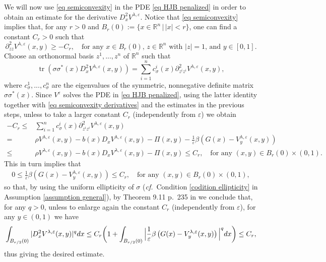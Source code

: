 \documentclass[11pt]{amsart}
\theoremstyle{plain}
\def \dd{{\rm d}}
\def \R{\mathbb{R}}
\DeclareMathOperator*{\tr}{tr}
\numberwithin{equation}{section}
\begin{document}
We will now use \eqref{eq semiconvexity} in the PDE \eqref{eq HJB penalized} in order to obtain an estimate for the derivative $D_x^2 V^{\lambda, \varepsilon}$.
Notice that \eqref{eq semiconvexity} implies that, for any $r>0$ and $B_r(0) := \{ x\in \mathbb R ^n \, |\, |x| < r \}$, one can find a constant $C_r >0 $ such that
\begin{equation}\label{eq semiconvexity derivatives}
\partial^2_{zz} V^{\lambda, \varepsilon}(x,y) \geq - C_r, \quad \text{for any $x \in B_r (0)$, $z \in \R^n$ with $|z|=1$, and $y \in [0,1]$.}
\end{equation}
Choose an orthonormal basis $z^1,...,z^n$ of $\R^n$ such that
$$
\tr (\sigma \sigma^* (x) D_x^2 V^{\lambda, \varepsilon}(x,y) ) = \sum_{i=1}^n c_{\sigma}^i (x) \partial^2_{z^i z^i} V^{\lambda, \varepsilon}(x,y), 
$$
where $c_{\sigma}^1,...,c_{\sigma}^n$ are the eigenvalues of the symmetric, nonnegative definite
matrix $\sigma \sigma^* (x)$.
Since $V^\varepsilon$ solves the PDE in \eqref{eq HJB penalized}, using the latter identity together with \eqref{eq semiconvexity derivatives} and the estimates in the previous steps, unless to take a larger constant $C_r$ (independently from $\varepsilon$) we obtain
\begin{equation*}
\begin{aligned}
    - C_r \leq &  \sum_{i=1}^n c_{\sigma}^i (x) \partial^2_{z^i z^i} V^{\lambda, \varepsilon}(x, y) \\
    =& \rho V^{\lambda, \varepsilon}(x, y)-b(x) D_{x} V^{\lambda, \varepsilon}(x, y)-\Pi(x, y)- \frac 1 {\varepsilon} \beta\left(G(x)-V_{y}^{\lambda, \varepsilon}(x, y)\right) \\
    \leq & \rho V^{\lambda, \varepsilon}(x, y)-b(x) D_{x} V^{\lambda, \varepsilon}(x, y)-\Pi(x, y)  \leq C_r,  \quad \text{for any $(x,y) \in B_r (0) \times (0,1)$}.
\end{aligned}
\end{equation*} 
This in turn implies that
\begin{equation*}
\begin{aligned}
    0\leq \frac 1 {\varepsilon} \beta\left(G(x)-V_{y}^{\lambda, \varepsilon}(x, y)\right)   \leq C_r ,  \quad \text{for any $(x,y) \in B_r (0) \times (0,1)$},
\end{aligned}
\end{equation*} 
so that, by using the uniform ellipticity of $\sigma$ ({\it cf.}\ Condition \ref{codition ellipticity} in Assumption \ref{assumption general}), by Theorem 9.11 p.\ 235 in \cite{gilbarg2001} we conclude that, for any $q>0$,  unless to enlarge again the constant $C_r$ (independently from $\varepsilon$), for any $y \in (0,1)$ we have
\begin{equation}
    \label{eq secon order derivative uniform estimate}
    \int_{B_{r/2} (0)} |D_x^2 V^{\lambda, \varepsilon}(x,y) |^q \dd x \leq C_r \bigg(1 + \int_{B_{r/2} (0)} \Big| \frac 1 {\varepsilon} \beta\left(G(x)-V_{y}^{\lambda, \varepsilon}(x, y)\right) \Big|^q \dd x \bigg) \leq C_r,
\end{equation}
thus giving the desired estimate.
\end{document}
